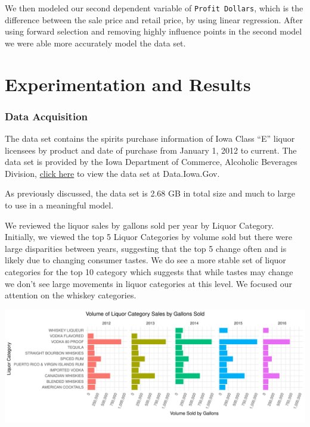 \documentclass[]{elsarticle} %
\makeatletter
\def\maxwidth{\ifdim\Gin@nat@width>\linewidth\linewidth
\else\Gin@nat@width\fi}
\let\Oldincludegraphics\includegraphics
\renewcommand{\includegraphics}[1]{\Oldincludegraphics[width=\maxwidth]{#1}}
\makeatother
\begin{document}
We then modeled our second dependent variable of
\texttt{Profit\ Dollars}, which is the difference between the sale price
and retail price, by using linear regression. After using forward
selection and removing highly influence points in the second model we
were able more accurately model the data set.

\section{Experimentation and Results}\label{experimentation-and-results}

\subsubsection{Data Acquisition}\label{data-acquisition}

The data set contains the spirits purchase information of Iowa Class
``E'' liquor licensees by product and date of purchase from January 1,
2012 to current. The data set is provided by the Iowa Department of
Commerce, Alcoholic Beverages Division,
\href{https://data.iowa.gov/Economy/Iowa-Liquor-Sales/m3tr-qhgy}{click
here} to view the data set at Data.Iowa.Gov.

As previously discussed, the data set is 2.68 GB in total size and much
to large to use in a meaningful model.

We reviewed the liquor sales by gallons sold per year by Liquor
Category. Initially, we viewed the top 5 Liquor Categories by volume
sold but there were large disparities between years, suggesting that the
top 5 change often and is likely due to changing consumer tastes. We do
see a more stable set of liquor categories for the top 10 category which
suggests that while tastes may change we don't see large movements in
liquor categories at this level. We focused our attention on the whiskey
categories.

\includegraphics{Final_Project_files/figure-latex/unnamed-chunk-6-1.pdf}
\end{document}
